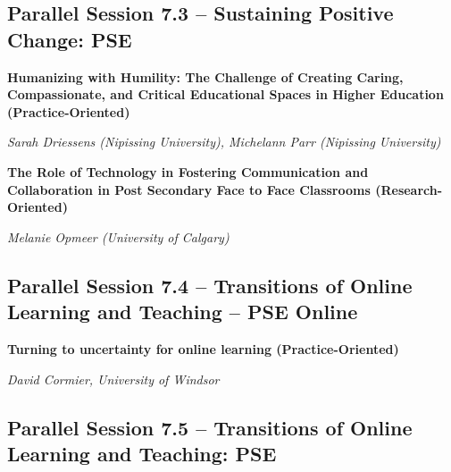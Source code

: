 \documentclass[
]{book}
\begin{document}
\hypertarget{parallel-session-7.3-sustaining-positive-change-pse}{%
\subsection*{Parallel Session 7.3 -- Sustaining Positive Change: PSE}\label{parallel-session-7.3-sustaining-positive-change-pse}}

\begin{secondary}
\textbf{Humanizing with Humility: The Challenge of Creating Caring,
Compassionate, and Critical Educational Spaces in Higher Education
(Practice-Oriented)}

\emph{Sarah Driessens (Nipissing University), Michelann Parr (Nipissing
University)}
\end{secondary}

\begin{secondary}
\textbf{The Role of Technology in Fostering Communication and
Collaboration in Post Secondary Face to Face Classrooms
(Research-Oriented)}

\emph{Melanie Opmeer (University of Calgary)}
\end{secondary}

\hypertarget{parallel-session-7.4-transitions-of-online-learning-and-teaching-pse-online}{%
\subsection*{Parallel Session 7.4 -- Transitions of Online Learning and Teaching -- PSE Online}\label{parallel-session-7.4-transitions-of-online-learning-and-teaching-pse-online}}

\begin{secondary}
\textbf{Turning to uncertainty for online learning (Practice-Oriented)}

\emph{David Cormier, University of Windsor}
\end{secondary}

\hypertarget{parallel-session-7.5-transitions-of-online-learning-and-teaching-pse}{%
\subsection*{Parallel Session 7.5 -- Transitions of Online Learning and Teaching: PSE}\label{parallel-session-7.5-transitions-of-online-learning-and-teaching-pse}}
\end{document}
